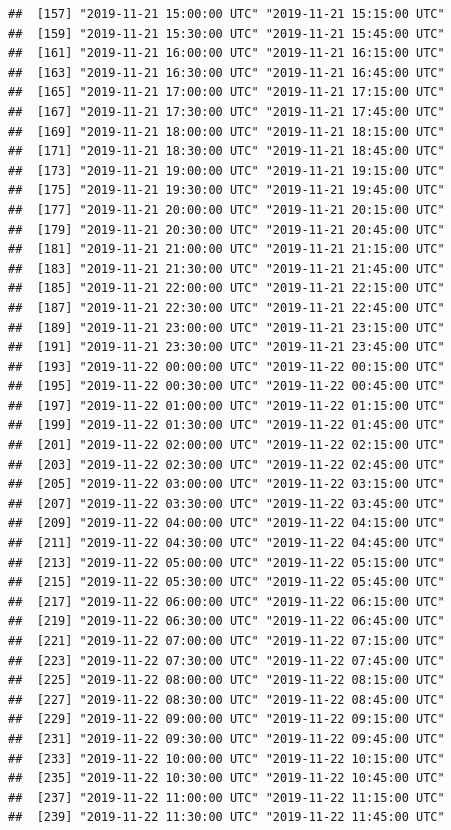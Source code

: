 \documentclass{article}\usepackage[]{graphicx}\usepackage[]{color}
\makeatletter
\newenvironment{kframe}{%
 \def\at@end@of@kframe{}%
 \ifinner\ifhmode%
  \def\at@end@of@kframe{\end{minipage}}%
  \begin{minipage}{\columnwidth}%
 \fi\fi%
 \def\FrameCommand##1{\hskip\@totalleftmargin \hskip-\fboxsep
 \colorbox{shadecolor}{##1}\hskip-\fboxsep
     \hskip-\linewidth \hskip-\@totalleftmargin \hskip\columnwidth}%
 \MakeFramed {\advance\hsize-\width
   \@totalleftmargin\z@ \linewidth\hsize
   \@setminipage}}%
 {\par\unskip\endMakeFramed%
 \at@end@of@kframe}
\newenvironment{knitrout}{}{} %
\makeatother
\begin{document}
\begin{knitrout}
\begin{kframe}
\begin{verbatim}
##  [157] "2019-11-21 15:00:00 UTC" "2019-11-21 15:15:00 UTC"
##  [159] "2019-11-21 15:30:00 UTC" "2019-11-21 15:45:00 UTC"
##  [161] "2019-11-21 16:00:00 UTC" "2019-11-21 16:15:00 UTC"
##  [163] "2019-11-21 16:30:00 UTC" "2019-11-21 16:45:00 UTC"
##  [165] "2019-11-21 17:00:00 UTC" "2019-11-21 17:15:00 UTC"
##  [167] "2019-11-21 17:30:00 UTC" "2019-11-21 17:45:00 UTC"
##  [169] "2019-11-21 18:00:00 UTC" "2019-11-21 18:15:00 UTC"
##  [171] "2019-11-21 18:30:00 UTC" "2019-11-21 18:45:00 UTC"
##  [173] "2019-11-21 19:00:00 UTC" "2019-11-21 19:15:00 UTC"
##  [175] "2019-11-21 19:30:00 UTC" "2019-11-21 19:45:00 UTC"
##  [177] "2019-11-21 20:00:00 UTC" "2019-11-21 20:15:00 UTC"
##  [179] "2019-11-21 20:30:00 UTC" "2019-11-21 20:45:00 UTC"
##  [181] "2019-11-21 21:00:00 UTC" "2019-11-21 21:15:00 UTC"
##  [183] "2019-11-21 21:30:00 UTC" "2019-11-21 21:45:00 UTC"
##  [185] "2019-11-21 22:00:00 UTC" "2019-11-21 22:15:00 UTC"
##  [187] "2019-11-21 22:30:00 UTC" "2019-11-21 22:45:00 UTC"
##  [189] "2019-11-21 23:00:00 UTC" "2019-11-21 23:15:00 UTC"
##  [191] "2019-11-21 23:30:00 UTC" "2019-11-21 23:45:00 UTC"
##  [193] "2019-11-22 00:00:00 UTC" "2019-11-22 00:15:00 UTC"
##  [195] "2019-11-22 00:30:00 UTC" "2019-11-22 00:45:00 UTC"
##  [197] "2019-11-22 01:00:00 UTC" "2019-11-22 01:15:00 UTC"
##  [199] "2019-11-22 01:30:00 UTC" "2019-11-22 01:45:00 UTC"
##  [201] "2019-11-22 02:00:00 UTC" "2019-11-22 02:15:00 UTC"
##  [203] "2019-11-22 02:30:00 UTC" "2019-11-22 02:45:00 UTC"
##  [205] "2019-11-22 03:00:00 UTC" "2019-11-22 03:15:00 UTC"
##  [207] "2019-11-22 03:30:00 UTC" "2019-11-22 03:45:00 UTC"
##  [209] "2019-11-22 04:00:00 UTC" "2019-11-22 04:15:00 UTC"
##  [211] "2019-11-22 04:30:00 UTC" "2019-11-22 04:45:00 UTC"
##  [213] "2019-11-22 05:00:00 UTC" "2019-11-22 05:15:00 UTC"
##  [215] "2019-11-22 05:30:00 UTC" "2019-11-22 05:45:00 UTC"
##  [217] "2019-11-22 06:00:00 UTC" "2019-11-22 06:15:00 UTC"
##  [219] "2019-11-22 06:30:00 UTC" "2019-11-22 06:45:00 UTC"
##  [221] "2019-11-22 07:00:00 UTC" "2019-11-22 07:15:00 UTC"
##  [223] "2019-11-22 07:30:00 UTC" "2019-11-22 07:45:00 UTC"
##  [225] "2019-11-22 08:00:00 UTC" "2019-11-22 08:15:00 UTC"
##  [227] "2019-11-22 08:30:00 UTC" "2019-11-22 08:45:00 UTC"
##  [229] "2019-11-22 09:00:00 UTC" "2019-11-22 09:15:00 UTC"
##  [231] "2019-11-22 09:30:00 UTC" "2019-11-22 09:45:00 UTC"
##  [233] "2019-11-22 10:00:00 UTC" "2019-11-22 10:15:00 UTC"
##  [235] "2019-11-22 10:30:00 UTC" "2019-11-22 10:45:00 UTC"
##  [237] "2019-11-22 11:00:00 UTC" "2019-11-22 11:15:00 UTC"
##  [239] "2019-11-22 11:30:00 UTC" "2019-11-22 11:45:00 UTC"

\end{verbatim}
\end{kframe}
\end{knitrout}
\end{document}
